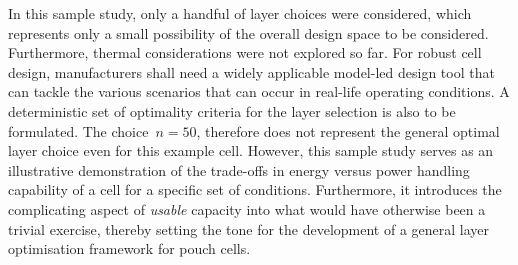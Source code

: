 In this  sample study, only  a handful of  layer choices were  considered, which
represents  only  a  small  possibility  of  the  overall  design  space  to  be
considered. Furthermore,  thermal considerations were  not explored so  far. For
robust  cell design,  manufacturers  shall need  a  widely applicable  model-led
design tool  that can tackle the  various scenarios that can  occur in real-life
operating conditions. A  deterministic set of optimality criteria  for the layer
selection  is also  to  be formulated.  The choice~${n=50}$,  therefore does  not
represent the general optimal layer choice  even for this example cell. However,
this sample study  serves as an illustrative demonstration of  the trade-offs in
energy  versus  power handling  capability  of  a cell  for  a  specific set  of
conditions. Furthermore, it introduces  the complicating aspect of \emph{usable}
capacity into what would have otherwise been a trivial exercise, thereby setting
the tone for the development of a general layer optimisation framework for pouch
cells.

